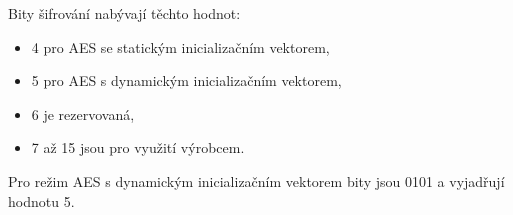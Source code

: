 \begin{table}[!ht]
\centering
\caption{Význam bitů pole ConfigurationWord}
\label{TableConfigurationWord}
\end{table}

Bity šifrování nabývají těchto hodnot:
\begin{itemize}
	\item 4 pro AES se statickým inicializačním vektorem,
	\item 5 pro AES s dynamickým inicializačním vektorem,
	\item 6 je rezervovaná,
	\item 7 až 15 jsou pro využití výrobcem.
\end{itemize}
Pro režim AES s dynamickým inicializačním vektorem bity jsou 0101 a vyjadřují hodnotu 5.

